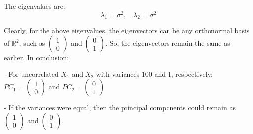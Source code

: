 \documentclass{article}
\begin{document}
\begin{enumerate}
\begin{enumerate}
        The eigenvalues are:
        \[
            \lambda_1 = \sigma^2, \quad \lambda_2 = \sigma^2
        \]
        
        Clearly, for the above eigenvalues, the eigenvectors can be any orthonormal basis of \(\mathbb{R}^2\), such as \(\begin{pmatrix} 1 \\ 0 \end{pmatrix}\) and \(\begin{pmatrix} 0 \\ 1 \end{pmatrix}\). So, the eigenvectors remain the same as earlier. In conclusion:
        
        - For uncorrelated \(X_1\) and \(X_2\) with variances 100 and 1, respectively:
           \(PC_1 = \begin{pmatrix} 1 \\ 0 \end{pmatrix}\)
          and \(PC_2 = \begin{pmatrix} 0 \\ 1 \end{pmatrix}\)
        
        - If the variances were equal, then the principal components could remain as \(\begin{pmatrix} 1 \\ 0 \end{pmatrix}\) and \(\begin{pmatrix} 0 \\ 1 \end{pmatrix}\).
        
\end{enumerate}
        
\end{enumerate}
\end{document}
